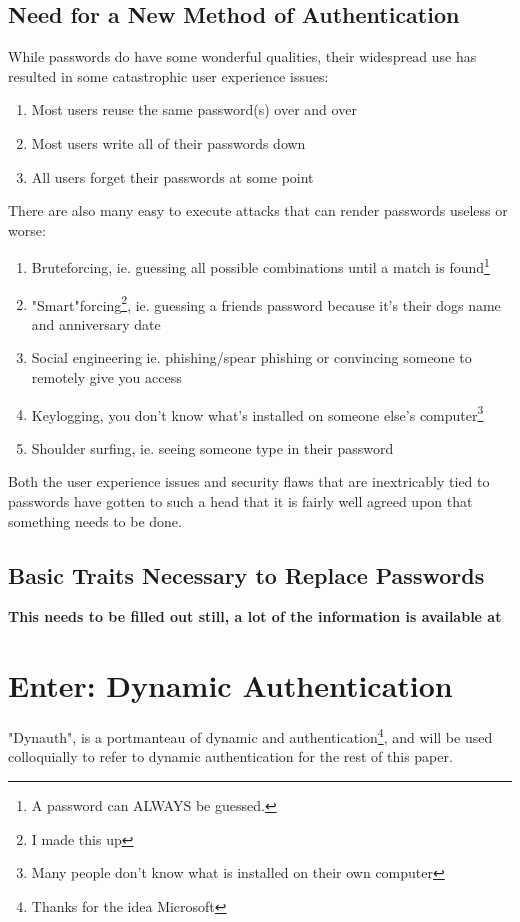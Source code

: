 \documentclass[conference]{IEEEtran}
\begin{document}
\subsection{Need for a New Method of Authentication}
While passwords do have some wonderful qualities, their widespread use has resulted in some catastrophic user experience issues:
\begin{enumerate}
	\item Most users reuse the same password(s) over and over\cite{Citation Needed}
	\item Most users write all of their passwords down\cite{Citation Needed}
	\item All users forget their passwords at some point\cite{Citation Needed}
\end{enumerate}
There are also many easy to execute attacks that can render passwords useless or worse:
\begin{enumerate}
	\item Bruteforcing, ie. guessing all possible combinations until a match is found\footnote{A password can ALWAYS be guessed.}
	\item "Smart"forcing\footnote{I made this up}, ie. guessing a friends password because it's their dogs name and anniversary date
	\item Social engineering ie. phishing/spear phishing or convincing someone to remotely give you access
	\item Keylogging, you don't know what's installed on someone else's computer\footnote{Many people don't know what is installed on their own computer}
	\item Shoulder surfing, ie. seeing someone type in their password
\end{enumerate}
Both the user experience issues and security flaws that are inextricably tied to passwords have gotten to such a head that it is fairly well agreed upon\cite{Citation Needed} that something needs to be done. 
\subsection{Basic Traits Necessary to Replace Passwords}
\textbf{This needs to be filled out still, a lot of the information is available at \cite{b1}}

\section{Enter: Dynamic Authentication}
	"Dynauth", is a portmanteau of dynamic and authentication\footnote{Thanks for the idea Microsoft}, and will be used colloquially to refer to dynamic authentication for the rest of this paper.
\end{document}
